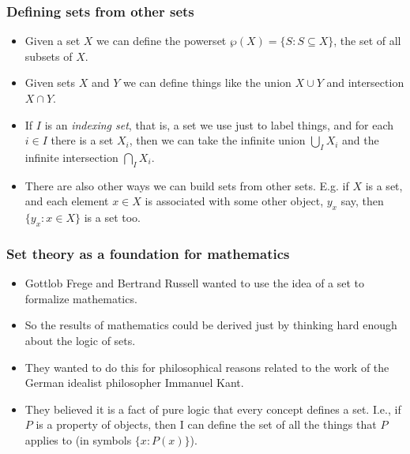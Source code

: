 \documentclass[handout]{beamer}
\begin{document}
\begin{frame}
\frametitle{Defining sets from other sets}
\begin{itemize}
\item Given a set $X$ we can define the powerset $\wp(X) = \{S:S\subseteq X\}$, the set of all subsets of $X$. 
\vspace{0.5cm}
\item Given sets $X$ and $Y$ we can define things like the union $X\cup Y$ and intersection $X\cap Y$. 
\vspace{0.5cm}
\item If $I$ is an \emph{indexing set}, that is, a set we use just to label things, and for each $i\in I$ there is a set $X_i$, then we can take the infinite union $\bigcup_I X_i$ and the infinite intersection $\bigcap_I X_i$.
\vspace{0.5cm}
\item There are also other ways we can build sets from other sets. E.g. if $X$ is a set, and each element $x\in X$ is associated with some other object, $y_x$ say, then $\{y_x:x\in X\}$ is a set too.
\end{itemize}
\end{frame}

\begin{frame}
\frametitle{Set theory as a foundation for mathematics}
\begin{itemize}
\item Gottlob Frege and Bertrand Russell wanted to use the idea of a set to formalize mathematics. 
\vspace{0.2cm}
\item So the results of mathematics could be derived just by thinking hard enough about the logic of sets.
\vspace{0.2cm}
\item They wanted to do this for philosophical reasons related to the work of the German idealist philosopher Immanuel Kant.
\vspace{0.2cm}
\item They believed it is a fact of pure logic that every concept defines a set. I.e., if $P$ is a property of objects, then I can define the set of all the things that $P$ applies to (in symbols $\{x:P(x)\}$).  
\end{itemize}
\end{frame}
\end{document}
